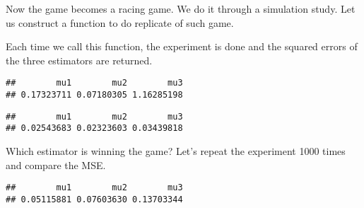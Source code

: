 \begin{illustration}
Now the game becomes a racing game. We do it through a simulation study.
Let us construct a function to do replicate of such game.
\begin{knitrout}
\color{fgcolor}\begin{kframe}
\begin{alltt}
 \hlkwb{<-} \hlstd{(}\hlstd{,} \hlstd{) \{}
     \hlkwb{<-}     \hlstd{=} \hlstd{)}
     \hlkwb{<-}  \hlstd{(} \hlstd{=}   \hlstd{=}   \hlstd{=} \hlstd{(}
     \hlopt{-} \hlopt{^}\hlstd{)}
\hlstd{\}}
\end{alltt}
\end{kframe}
\end{knitrout}

Each time we call this function, the experiment is done and the squared errors
of the three estimators are returned.
\begin{knitrout}
\color{fgcolor}\begin{kframe}
\begin{alltt}
\end{alltt}
\begin{verbatim}
##        mu1        mu2        mu3 
## 0.17323711 0.07180305 1.16285198
\end{verbatim}
\begin{alltt}
\end{alltt}
\begin{verbatim}
##        mu1        mu2        mu3 
## 0.02543683 0.02323603 0.03439818
\end{verbatim}
\end{kframe}
\end{knitrout}



Which estimator is winning the game? Let's repeat the experiment 1000 times and
compare the MSE.
\begin{knitrout}
\color{fgcolor}\begin{kframe}
\begin{alltt}
 \hlkwb{<-} 
 \hlkwb{<-}  
\end{alltt}
\begin{verbatim}
##        mu1        mu2        mu3 
## 0.05115881 0.07603630 0.13703344
\end{verbatim}
\end{kframe}
\end{knitrout}



\end{illustration}
